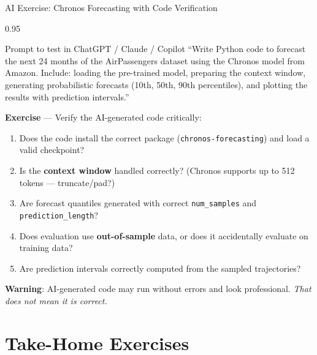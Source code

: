 \documentclass[9pt, aspectratio=169, t]{beamer}
\begin{document}
\begin{frame}{AI Exercise: Chronos Forecasting with Code Verification}
    \begin{cminipage}{0.95\textwidth}
    \vspace{-0.3cm}
    \begin{block}{\footnotesize Prompt to test in ChatGPT / Claude / Copilot}
        {\scriptsize
        ``Write Python code to forecast the next 24 months of the AirPassengers dataset using the Chronos model from Amazon. Include: loading the pre-trained model, preparing the context window, generating probabilistic forecasts (10th, 50th, 90th percentiles), and plotting the results with prediction intervals.''
        }
    \end{block}
    \vspace{-3mm}
    {\scriptsize
    \textbf{Exercise} --- Verify the AI-generated code critically:
    \begin{enumerate}\setlength{\itemsep}{0pt}
        \item Does the code install the correct package (\texttt{chronos-forecasting}) and load a valid checkpoint?
        \item Is the \textbf{context window} handled correctly? (Chronos supports up to 512 tokens --- truncate/pad?)
        \item Are forecast quantiles generated with correct \texttt{num\_samples} and \texttt{prediction\_length}?
        \item Does evaluation use \textbf{out-of-sample} data, or does it accidentally evaluate on training data?
        \item Are prediction intervals correctly computed from the sampled trajectories?
    \end{enumerate}
    }
    \vspace{-3mm}
    \begin{alertblock}{}
        {\footnotesize \textbf{Warning}: AI-generated code may run without errors and look professional. \textit{That does not mean it is correct.}}
    \end{alertblock}
    \end{cminipage}
\end{frame}

\section{Take-Home Exercises}
\end{document}
